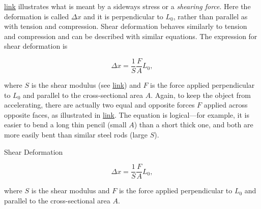 \documentclass[
]{book}
\newenvironment{note}{}{}
\begin{document}
\protect\hyperlink{import-auto-id1165296375245}{link} illustrates
what is meant by a sideways stress or a \emph{shearing force}. Here the
deformation is called \({\Delta x}{}\) and it is perpendicular to
\(L_{0}{}\), rather than parallel as with tension and compression. Shear
deformation behaves similarly to tension and compression and can be
described with similar equations. The expression for \protect\hypertarget{import-auto-id1165296259204}{}{shear
deformation} is

\leavevmode\hypertarget{eip-178}{}%
\[{{\Delta x = \frac{1}{S}}\frac{F}{A}L_{0}}{},\]

where \(S{}\) is the shear modulus (see
\protect\hyperlink{import-auto-id1165298671576}{link}) and \(F{}\)
is the force applied perpendicular to \(L_{0}{}\) and parallel to the
cross-sectional area \(A{}\). Again, to keep the object from accelerating,
there are actually two equal and opposite forces \(F{}\) applied across
opposite faces, as illustrated in
\protect\hyperlink{import-auto-id1165296375245}{link}. The
equation is logical---for example, it is easier to bend a long thin
pencil (small \(A{}\)) than a short thick one, and both are more easily
bent than similar steel rods (large \(S{}\)).

\hypertarget{fs-id1165298835468}{}
\begin{note}

Shear Deformation

\leavevmode\hypertarget{eip-894}{}%
\[{{{\Delta x = \frac{1}{S}}\frac{F}{A}L_{0}},}{}\]

where \(S{}\) is the shear modulus and \(F{}\) is the force applied
perpendicular to \(L_{0}{}\) and parallel to the cross-sectional area
\(A{}\).

\end{note}
\end{document}
